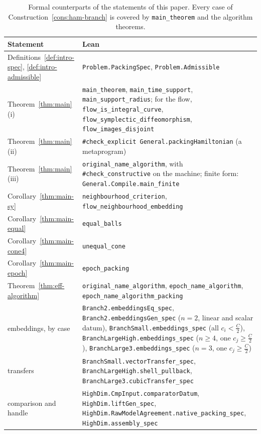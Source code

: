 \begin{table}[ht]
\centering
\footnotesize
\renewcommand{\arraystretch}{1.15}
\begin{tabular}{@{}L{0.24\textwidth}L{0.7\textwidth}@{}}
\toprule
Statement & Lean \\
\midrule
Definitions~\ref{def:intro-spec}, \ref{def:intro-admissible} & \texttt{Problem.PackingSpec}, \texttt{Problem.Admissible} \\
Theorem~\ref{thm:main}(i) & \texttt{main\_theorem}, \texttt{main\_time\_support}, \texttt{main\_support\_radius}; for the
 flow, \texttt{flow\_is\_integral\_curve}, \texttt{flow\_symplectic\_diffeomorphism}, \texttt{flow\_images\_disjoint} \\
Theorem~\ref{thm:main}(ii) & \texttt{\#check\_explicit General.packingHamiltonian} (a metaprogram) \\
Theorem~\ref{thm:main}(iii) & \texttt{original\_name\_algorithm}, with \texttt{\#check\_constructive} on the machine;
 finite form: \texttt{General.Compile.main\_finite} \\
Corollary~\ref{thm:main-sy} & \texttt{neighbourhood\_criterion}, \texttt{flow\_neighbourhood\_embedding} \\
Corollary~\ref{thm:main-equal} & \texttt{equal\_balls} \\
Corollary~\ref{thm:main-cone4} & \texttt{unequal\_cone} \\
Corollary~\ref{thm:main-epoch} & \texttt{epoch\_packing} \\
Theorem~\ref{thm:eff-algorithm} & \texttt{original\_name\_algorithm}, \texttt{epoch\_name\_algorithm}, \texttt{epoch\_name\_algorithm\_packing} \\
embeddings, by case & \texttt{Branch2.embeddingsEq\_spec}, \texttt{Branch2.embeddingsGen\_spec} ($n=2$, linear and scalar datum), \texttt{BranchSmall.embeddings\_spec} (all $c_i<\frac C2$),
 \texttt{BranchLargeHigh.embeddings\_spec} ($n\ge4$, one $c_j\ge\frac C2$), \texttt{BranchLarge3.embeddings\_spec}
 ($n=3$, one $c_j\ge\frac C2$) \\
transfers & \texttt{BranchSmall.vectorTransfer\_spec}, \texttt{BranchLargeHigh.shell\_pullback},
 \texttt{BranchLarge3.cubicTransfer\_spec} \\
comparison and handle & \texttt{HighDim.CmpInput.comparatorDatum}, \texttt{HighDim.liftGen\_spec},
 \texttt{HighDim.RawModelAgreement.native\_packing\_spec}, \texttt{HighDim.assembly\_spec} \\
\bottomrule
\end{tabular}
\caption{Formal counterparts of the statements of this paper. Every case of Construction~\ref{cons:ham-branch} is
covered by \texttt{main\_theorem} and the algorithm theorems.}
\label{p2:tab-ver}
\end{table}


